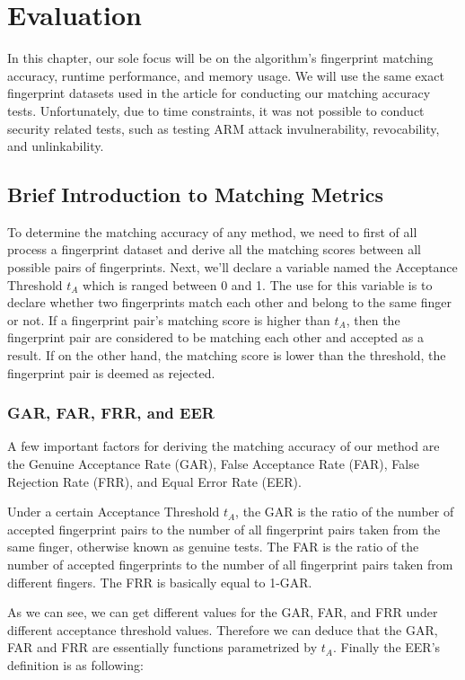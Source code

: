 \documentclass[fyp]{socreport}
\begin{document}
\chapter{Evaluation}
In this chapter, our sole focus will be on the algorithm's fingerprint matching accuracy, runtime performance, and memory usage. We will use the same exact fingerprint datasets used in the article for conducting our matching accuracy tests. Unfortunately, due to time constraints, it was not possible to conduct security related tests, such as testing ARM attack invulnerability, revocability, and unlinkability.

\section{Brief Introduction to Matching Metrics}
To determine the matching accuracy of any method, we need to first of all process a fingerprint dataset and derive all the matching scores between all possible pairs of fingerprints. Next, we'll declare a variable named the Acceptance Threshold $t_A$ which is ranged between 0 and 1. The use for this variable is to declare whether two fingerprints match each other and belong to the same finger or not. If a fingerprint pair's matching score is higher than $t_A$, then the fingerprint pair are considered to be matching each other and accepted as a result. If on the other hand, the matching score is lower than the threshold, the fingerprint pair is deemed as rejected.

\subsection{GAR, FAR, FRR, and EER}
A few important factors for deriving the matching accuracy of our method are the Genuine Acceptance Rate (GAR), False Acceptance Rate (FAR), False Rejection Rate (FRR), and Equal Error Rate (EER).

Under a certain Acceptance Threshold $t_A$, the GAR is the ratio of the number of accepted fingerprint pairs to the number of all fingerprint pairs taken from the same finger, otherwise known as genuine tests. The FAR is the ratio of the number of accepted fingerprints to the number of all fingerprint pairs taken from different fingers. The FRR is basically equal to 1-GAR.

As we can see, we can get different values for the GAR, FAR, and FRR under different acceptance threshold values. Therefore we can deduce that the GAR, FAR and FRR are essentially functions parametrized by $t_A$. Finally the EER's definition is as following:
\end{document}
